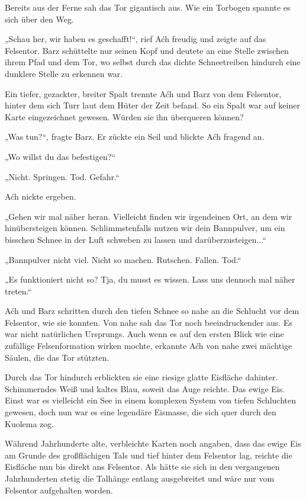 Bereits aus der Ferne sah das Tor gigantisch aus. Wie ein Torbogen spannte es sich über den Weg.

„Schau her, wir haben es geschafft!“, rief Aćh freudig und zeigte auf das Felsentor. Barz schüttelte nur seinen Kopf und deutete an eine Stelle zwischen ihrem Pfad und dem Tor, wo selbst durch das dichte Schneetreiben hindurch eine dunklere Stelle zu erkennen war.

Ein tiefer, gezackter, breiter Spalt trennte Aćh und Barz von dem Felsentor, hinter dem sich Turr laut dem Hüter der Zeit befand. So ein Spalt war auf keiner Karte eingezeichnet gewesen. Würden sie ihn überqueren können?

„Was tun?“, fragte Barz. Er zückte ein Seil und blickte Aćh fragend an.

„Wo willst du das befestigen?“

„Nicht. Springen. Tod. Gefahr.“

Aćh nickte ergeben.

„Gehen wir mal näher heran. Vielleicht finden wir irgendeinen Ort, an dem wir hinübersteigen können. Schlimmstenfalls nutzen wir dein Bannpulver, um ein bisschen Schnee in der Luft schweben zu lassen und darüberzusteigen...“

„Bannpulver nicht viel. Nicht so machen. Rutschen. Fallen. Tod.“

„Es funktioniert nicht so? Tja, du musst es wissen. Lass uns dennoch mal näher treten.“

Aćh und Barz schritten durch den tiefen Schnee so nahe an die Schlucht vor dem Felsentor, wie sie konnten. Von nahe sah das Tor noch beeindruckender aus. Es war nicht natürlichen Ursprungs. Auch wenn es auf den ersten Blick wie eine zufällige Felsenformation wirken mochte, erkannte Aćh von nahe zwei mächtige Säulen, die das Tor stützten.

Durch das Tor hindurch erblickten sie eine riesige glatte Eisfläche dahinter. Schimmerndes Weiß und kaltes Blau, soweit das Auge reichte. Das ewige Eis. Einst war es vielleicht ein See in einem komplexen System von tiefen Schluchten gewesen, doch nun war es eine legendäre Eismasse, die sich quer durch den Kuolema zog.

Während Jahrhunderte alte, verbleichte Karten noch angaben, dass das ewige Eis am Grunde des großflächigen Tals und tief hinter dem Felsentor lag, reichte die Eisfläche nun bis direkt ans Felsentor. Als hätte sie sich in den vergangenen Jahrhunderten stetig die Talhänge entlang ausgebreitet und wäre nur vom Felsentor aufgehalten worden.

